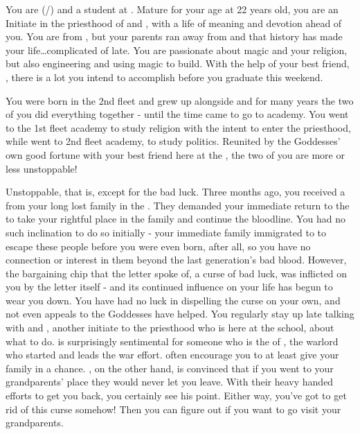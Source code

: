 \documentclass[char]{GL2020}
\begin{document}
\name{\cInitiate{}}



You are \cInitiate{\full} (\cInitiate{\they}/\cInitiate{\them}) and a student at \pSchool{}. Mature for your age at 22 years old, you are an Initiate in the priesthood of \cEbb{} and \cFlow{}, with a life of meaning and devotion ahead of you. You are from \pShip{}, but your parents ran away from \pFarm{} and that history has made your life\ldots complicated of late. You are passionate about magic and your religion, but also engineering and using magic to build. With the help of your best friend, \cPresident{\full}, there is a lot you intend to accomplish before you graduate this weekend.

You were born in the 2nd fleet and grew up alongside \cPresident{} and for many years the two of you did everything together - until the time came to go to academy. You went to the 1st fleet academy to study religion with the intent to enter the priesthood, while \cPresident{\they} went to 2nd fleet academy, to study politics. Reunited by the Goddesses’ own good fortune with your best friend here at the \pSchool{}, the two of you are more or less unstoppable!

Unstoppable, that is, except for the bad luck. Three months ago, you received a \iCursedLetter{} from your long lost family in the \pFarm{}. They demanded your immediate return to the \pFarm{} to take your rightful place in the family and continue the bloodline. You had no such inclination to do so initially - your immediate family immigrated to \pShip{} to escape these people before you were even born, after all, so you have no connection or interest in them beyond the last generation’s bad blood. However, the bargaining chip that the letter spoke of, a curse of bad luck, was inflicted on you by the letter itself - and its continued influence on your life has begun to wear you down. You have had no luck in dispelling the curse on your own, and not even appeals to the Goddesses have helped. You regularly stay up late talking with \cPresident{} and \cWarlordDaughter{}, another initiate to the priesthood who is here at the school, about what to do. \cWarlordDaughter{} is surprisingly sentimental for someone who is the \cWarlordDaughter{\child} of \cLoud{\full}, the warlord who started and leads the \pShip{} war effort. \cWarlordDaughter{\They} often encourage\cWarlordDaughter{\plural} you to at least give your family in \pFarm{} a chance. \cPresident{}, on the other hand, is convinced that if you went to your grandparents' place they would never let you leave.  With their heavy handed efforts to get you back, you certainly see his point.  Either way, you’ve got to get rid of this curse somehow! Then you can figure out if you want to go visit your grandparents.
\end{document}
